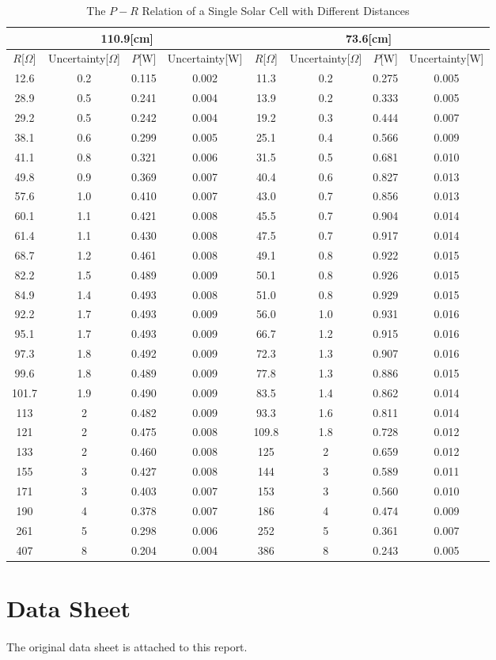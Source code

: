 \documentclass[a4paper]{article}
\begin{document}
    \begin{table}[H]
        \centering
        \begin{tabular}{|c|c|c|c||c|c|c|c|}
            \hline
            \multicolumn{4}{|c||}{110.9[cm]}&\multicolumn{4}{c|}{73.6[cm]}\\\hline
            $R$[$\Omega$]&Uncertainty[$\Omega$]&$P$[W]&Uncertainty[W]&$R$[$\Omega$]&Uncertainty[$\Omega$]&$P$[W]&Uncertainty[W]\\\hline
            12.6&0.2&0.115&0.002&11.3&0.2&0.275&0.005\\\hline
            28.9&0.5&0.241&0.004&13.9&0.2&0.333&0.005\\\hline
            29.2&0.5&0.242&0.004&19.2&0.3&0.444&0.007\\\hline
            38.1&0.6&0.299&0.005&25.1&0.4&0.566&0.009\\\hline
            41.1&0.8&0.321&0.006&31.5&0.5&0.681&0.010\\\hline
            49.8&0.9&0.369&0.007&40.4&0.6&0.827&0.013\\\hline
            57.6&1.0&0.410&0.007&43.0&0.7&0.856&0.013\\\hline
            60.1&1.1&0.421&0.008&45.5&0.7&0.904&0.014\\\hline
            61.4&1.1&0.430&0.008&47.5&0.7&0.917&0.014\\\hline
            68.7&1.2&0.461&0.008&49.1&0.8&0.922&0.015\\\hline
            82.2&1.5&0.489&0.009&50.1&0.8&0.926&0.015\\\hline
            84.9&1.4&0.493&0.008&51.0&0.8&0.929&0.015\\\hline
            92.2&1.7&0.493&0.009&56.0&1.0&0.931&0.016\\\hline
            95.1&1.7&0.493&0.009&66.7&1.2&0.915&0.016\\\hline
            97.3&1.8&0.492&0.009&72.3&1.3&0.907&0.016\\\hline
            99.6&1.8&0.489&0.009&77.8&1.3&0.886&0.015\\\hline
            101.7&1.9&0.490&0.009&83.5&1.4&0.862&0.014\\\hline
            113&2&0.482&0.009&93.3&1.6&0.811&0.014\\\hline
            121&2&0.475&0.008&109.8&1.8&0.728&0.012\\\hline
            133&2&0.460&0.008&125&2&0.659&0.012\\\hline
            155&3&0.427&0.008&144&3&0.589&0.011\\\hline
            171&3&0.403&0.007&153&3&0.560&0.010\\\hline
            190&4&0.378&0.007&186&4&0.474&0.009\\\hline
            261&5&0.298&0.006&252&5&0.361&0.007\\\hline
            407&8&0.204&0.004&386&8&0.243&0.005\\\hline
        \end{tabular}
        \caption{The $P-R$ Relation of a Single Solar Cell with Different Distances}
        \label{tab:PRsingle}
    \end{table}
    \section{Data Sheet}
    \paragraph{} The original data sheet is attached to this report.
\end{document}
